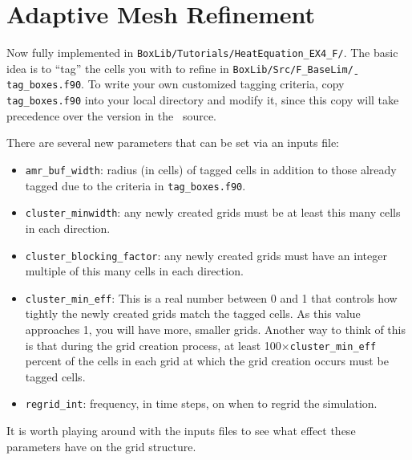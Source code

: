 \section{Adaptive Mesh Refinement}\label{Sec:AMR}
Now fully implemented in {\tt BoxLib/Tutorials/HeatEquation\_EX4\_F/}.  The basic idea is
to ``tag'' the cells you with to refine in {\tt BoxLib/Src/F\_BaseLim\b/tag\_boxes.f90}.  To write
your own customized tagging criteria, copy {\tt tag\_boxes.f90} into your local directory and modify
it, since this copy will take precedence over the version in the \BoxLib~source.

There are several new
parameters that can be set via an inputs file:
\begin{itemize}
\item {\tt amr\_buf\_width}: radius (in cells) of tagged cells in addition to those already tagged due to the criteria in {\tt tag\_boxes.f90}.
\item {\tt cluster\_minwidth}: any newly created grids must be at least this many cells in each direction.
\item {\tt cluster\_blocking\_factor}: any newly created grids must have an integer multiple of this many cells in each direction.
\item {\tt cluster\_min\_eff}: This is a real number between 0 and 1 that controls how tightly the newly created grids match the tagged cells.  As this value approaches 1, you will have more, smaller grids.  Another way to think of this is that during the grid creation process, at least 100$\times${\tt cluster\_min\_eff} percent of the cells in each grid at which the grid creation occurs must be tagged cells.
\item {\tt regrid\_int}: frequency, in time steps, on when to regrid the simulation.
\end{itemize}
It is worth playing around with the inputs files to see what effect these parameters have on the grid structure.

